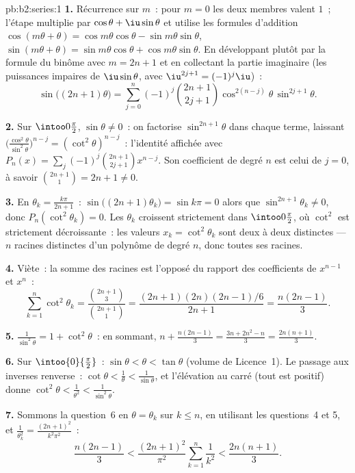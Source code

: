\begin{solution}{pb:b2:series:1}
\textbf{1.} Récurrence sur $m$~: pour $m = 0$ les deux membres valent
$1$~; l'étape multiplie par $\cos\theta + \iu\sin\theta$ et utilise
les formules d'addition $\cos(m\theta + \theta) =
\cos m\theta\cos\theta - \sin m\theta\sin\theta$, $\sin(m\theta
+ \theta) = \sin m\theta\cos\theta + \cos m\theta\sin\theta$. En
développant plutôt par la formule du binôme avec $m = 2n+1$ et en
collectant la partie imaginaire (les puissances impaires de
$\iu\sin\theta$, avec $\iu^{2j+1} = (-1)^j\iu$)~:
\[
\sin\bigl((2n{+}1)\theta\bigr) = \sum_{j=0}^{n}(-1)^j
\binom{2n+1}{2j+1}\cos^{2(n-j)}\theta\,\sin^{2j+1}\theta .
\]

\textbf{2.} Sur $\intoo0{\frac\pi2}$, $\sin\theta \neq 0$~: on
factorise $\sin^{2n+1}\theta$ dans chaque terme, laissant
$\bigl(\frac{\cos^2\theta}{\sin^2\theta}\bigr)^{n-j} =
(\cot^2\theta)^{n-j}$~: l'identité affichée avec $P_n(x) =
\sum_j(-1)^j\binom{2n+1}{2j+1}x^{n-j}$. Son coefficient de degré $n$
est celui de $j = 0$, à savoir $\binom{2n+1}{1} = 2n + 1 \neq 0$.

\textbf{3.} En $\theta_k = \frac{k\pi}{2n+1}$~:
$\sin\bigl((2n{+}1)\theta_k\bigr) = \sin k\pi = 0$ alors que
$\sin^{2n+1}\theta_k \neq 0$, donc $P_n(\cot^2\theta_k) = 0$. Les
$\theta_k$ croissent strictement dans $\intoo0{\frac\pi2}$, où
$\cot^2$ est strictement décroissante~: les valeurs $x_k =
\cot^2\theta_k$ sont deux à deux distinctes --- $n$ racines distinctes
d'un polynôme de degré $n$, donc toutes ses racines.

\textbf{4.} Viète~: la somme des racines est l'opposé du rapport des
coefficients de $x^{n-1}$ et $x^n$~:
\[
\sum_{k=1}^{n}\cot^2\theta_k =
\frac{\binom{2n+1}{3}}{\binom{2n+1}{1}}
= \frac{(2n+1)(2n)(2n-1)/6}{2n+1} = \frac{n(2n-1)}{3}.
\]

\textbf{5.} $\frac{1}{\sin^2\theta} = 1 + \cot^2\theta$~: en sommant,
$n + \frac{n(2n-1)}3 = \frac{3n + 2n^2 - n}{3} =
\frac{2n(n+1)}{3}$.

\textbf{6.} Sur $\intoo{0}{\frac\pi2}$~: $\sin\theta < \theta <
\tan\theta$ (volume de Licence~1). Le passage aux inverses renverse~:
$\cot\theta < \frac1\theta < \frac1{\sin\theta}$, et l'élévation au
carré (tout est positif) donne $\cot^2\theta < \frac1{\theta^2} <
\frac1{\sin^2\theta}$.

\textbf{7.} Sommons la question~6 en $\theta = \theta_k$ sur $k \leq
n$, en utilisant les questions~4 et 5, et $\frac1{\theta_k^2} =
\frac{(2n+1)^2}{k^2\pi^2}$~:
\[
\frac{n(2n-1)}3 < \frac{(2n+1)^2}{\pi^2}\sum_{k=1}^n\frac1{k^2}
< \frac{2n(n+1)}3 .
\]


\end{solution}

